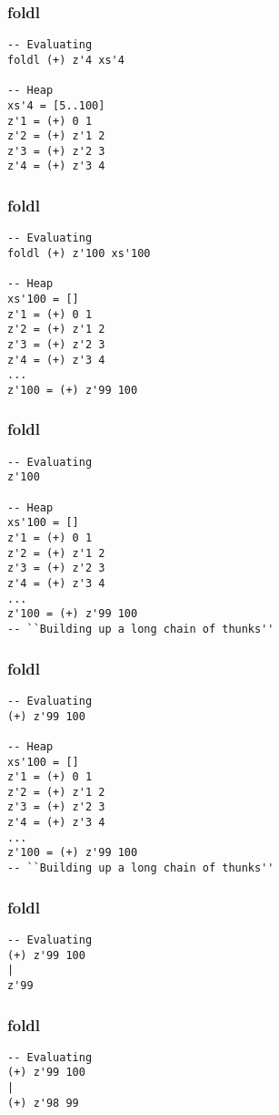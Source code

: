 \documentclass{beamer}
\begin{document}
\begin{frame}[t,fragile]
\frametitle{foldl}
\begin{verbatim}
-- Evaluating
foldl (+) z'4 xs'4

-- Heap
xs'4 = [5..100]
z'1 = (+) 0 1
z'2 = (+) z'1 2
z'3 = (+) z'2 3
z'4 = (+) z'3 4
\end{verbatim}
\end{frame}

\begin{frame}[t,fragile]
\frametitle{foldl}
\begin{verbatim}
-- Evaluating
foldl (+) z'100 xs'100

-- Heap
xs'100 = []
z'1 = (+) 0 1
z'2 = (+) z'1 2
z'3 = (+) z'2 3
z'4 = (+) z'3 4
...
z'100 = (+) z'99 100
\end{verbatim}
\end{frame}

\begin{frame}[t,fragile]
\frametitle{foldl}
\begin{verbatim}
-- Evaluating
z'100

-- Heap
xs'100 = []
z'1 = (+) 0 1
z'2 = (+) z'1 2
z'3 = (+) z'2 3
z'4 = (+) z'3 4
...
z'100 = (+) z'99 100
-- ``Building up a long chain of thunks''
\end{verbatim}
\end{frame}

\begin{frame}[t,fragile]
\frametitle{foldl}
\begin{verbatim}
-- Evaluating
(+) z'99 100

-- Heap
xs'100 = []
z'1 = (+) 0 1
z'2 = (+) z'1 2
z'3 = (+) z'2 3
z'4 = (+) z'3 4
...
z'100 = (+) z'99 100
-- ``Building up a long chain of thunks''
\end{verbatim}
\end{frame}

\begin{frame}[t,fragile]
\frametitle{foldl}
\begin{verbatim}
-- Evaluating
(+) z'99 100
|
z'99
\end{verbatim}
\end{frame}

\begin{frame}[t,fragile]
\frametitle{foldl}
\begin{verbatim}
-- Evaluating
(+) z'99 100
|
(+) z'98 99
\end{verbatim}
\end{frame}
\end{document}
